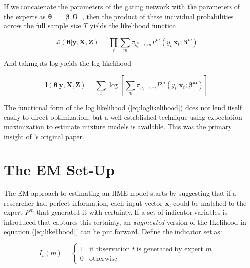 \documentclass[12pt]{article}
\newcommand{\gateprod}[2]{\pi_{#1 \longrightarrow #2}}
\theoremstyle{definition}
\begin{document}
\bigskip

If we concatenate the parameters of the gating network with the parameters
of the experts as $\boldsymbol{\theta} = [\boldsymbol{\beta} \,\, \boldsymbol{\Omega}]$,
then the product of these individual probabilities across the full sample size $T$ yields
the likelihood function. 

\begin{equation} \label{eq:likelihood}
  \mathcal{L}(\boldsymbol{\theta}| \boldsymbol{y}, \boldsymbol{X}, \boldsymbol{Z}) = \prod_{t}  \sum_{m} \gateprod{g^{0}_{t}}{m}  P^{m}(y_{t}| \boldsymbol{x}_{t}; \boldsymbol{\beta}^{m})
\end{equation}

And taking its log yields the log likelihood

\begin{equation} \label{eq:loglikelihood}
  \boldsymbol{l}(\boldsymbol{\theta}| \boldsymbol{y}, \boldsymbol{X}, \boldsymbol{Z}) = \sum_{t} \log \left[ \sum_{m} \gateprod{g^{0}_{t}}{m} P^{m}(y_{t}| \boldsymbol{x}_{t}; \boldsymbol{\beta^{m}}) \right]
\end{equation}

The functional form of the log likelihood (\ref{eq:loglikelihood}) does not
lend itself easily to direct optimization, but a well established
technique using expectation maximization \citep{EM_DLR1977} to estimate mixture
models is available. This was the primary insight of \citet{JordanJacobs1993}'s
original paper.


\section{The EM Set-Up} \label{sec:Estimation}

The EM approach to estimating an HME model starts by suggesting that if a
researcher had perfect information, each input vector $\boldsymbol{x}_{t}$ could be matched
to the expert $P^{m}$ that generated it with certainty. If a set of indicator
variables is introduced that captures this certainty, an \textit{augmented}
version of the likelihood in equation (\ref{eq:likelihood}) can be put forward.
Define the indicator set as:

\begin{equation} \label{eq:indicator}
  I_{t}(m) = \begin{cases} 
     1 & \textrm{if observation $t$ is generated by expert $m$} \\
     0 & \textrm{otherwise}
             \end{cases}
\end{equation}
\end{document}
